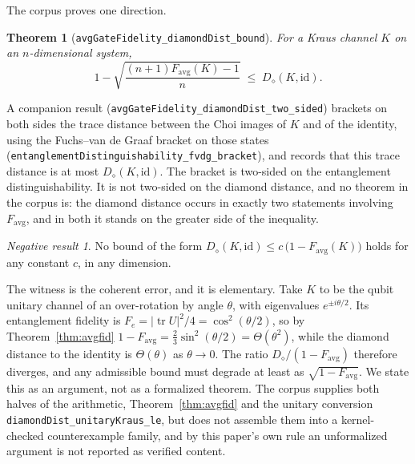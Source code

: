 \documentclass[aps,pra,reprint,nofootinbib,superscriptaddress]{revtex4-2}
\theoremstyle{plain}
\newtheorem{theorem}{Theorem}
\theoremstyle{definition}
\theoremstyle{remark}
\newtheorem{nonresult}{Negative result}
\newcommand{\lean}[1]{\texttt{#1}}
\newcommand{\ddist}{D_{\diamond}}
\begin{document}
The corpus proves one direction.

\begin{theorem}[\lean{avgGateFidelity\_diamondDist\_bound}]
\label{thm:rblower}
For a Kraus channel $K$ on an $n$-dimensional system,
\[
1 - \sqrt{\frac{(n+1)F_{\mathrm{avg}}(K) - 1}{n}}
\;\le\; \ddist(K,\mathrm{id}).
\]
\end{theorem}

A companion result (\lean{avgGateFidelity\_diamondDist\_two\_sided})
brackets on both sides the trace distance between the Choi images of $K$
and of the identity, using the Fuchs--van de Graaf bracket on those
states (\lean{entanglementDistinguishability\_fvdg\_bracket}), and
records that this trace distance is at most $\ddist(K,\mathrm{id})$. The
bracket is two-sided on the entanglement distinguishability. It is not
two-sided on the diamond distance, and no theorem in the corpus is: the
diamond distance occurs in exactly two statements involving
$F_{\mathrm{avg}}$, and in both it stands on the greater side of the
inequality.

\begin{nonresult}
\label{nr:rb}
No bound of the form
$\ddist(K,\mathrm{id}) \le c\,\big(1-F_{\mathrm{avg}}(K)\big)$ holds for
any constant $c$, in any dimension.
\end{nonresult}

The witness is the coherent error, and it is elementary. Take $K$ to be
the qubit unitary channel of an over-rotation by angle $\theta$, with
eigenvalues $e^{\pm i\theta/2}$. Its entanglement fidelity is
$F_e = |\operatorname{tr}U|^2/4 = \cos^2(\theta/2)$, so by
Theorem~\ref{thm:avgfid}
$1 - F_{\mathrm{avg}} = \tfrac23\sin^2(\theta/2) = \Theta(\theta^2)$,
while the diamond distance to the identity is $\Theta(\theta)$ as
$\theta \to 0$. The ratio $\ddist/(1-F_{\mathrm{avg}})$ therefore
diverges, and any admissible bound must degrade at least as
$\sqrt{1-F_{\mathrm{avg}}}$. We state this as an argument, not as a
formalized theorem. The corpus supplies both halves of the arithmetic,
Theorem~\ref{thm:avgfid} and the unitary conversion
\lean{diamondDist\_unitaryKraus\_le}, but does not assemble them into a
kernel-checked counterexample family, and by this paper's own rule an
unformalized argument is not reported as verified content.

\end{document}

